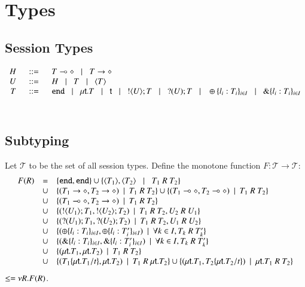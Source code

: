 \section{Types}

\subsection{Session Types}

\[
	\begin{array}{rcl}
		H &\;\;::=\;\;&	T \multimap \diamond \;\;\;|\;\;\; T \rightarrow \diamond \\
		U &\;\;::=\;\;&	H \;\;\;|\;\;\; T \;\;\;|\;\;\; \langle T \rangle \\
		T &\;\;::=\;\;&	\mathtt{end} \;\;\;|\;\;\; \mu\mathsf{t}.T \;\;\;|\;\;\; \mathsf{t} \;\;\;|\;\;\; ! \langle U \rangle ; T \;\;\;|\;\;\; ? (U) ; T
		\;\;\;|\;\;\;		\oplus \{l_i:T_i\}_{i \in I} \;\;\;|\;\;\; \& \{l_i:T_i\}_{i \in I}
	\end{array}
\]\


\subsection{Subtyping}



\begin{definition}
Let $\mathcal{T}$ to be the set of all session types.
Define the monotone function $F: \mathcal{T} \longrightarrow \mathcal{T}$:
%
\[
	\begin{array}{rcl}
		F(R)	& = &	\set{\tinact, \tinact}
			\cup	\set{\chtype{T_1}, \chtype{T_2} \bnfbar T_1\ R\ T_2}\\
			&\cup&	\set{(T_1 \sharedop \diamond, T_2 \sharedop \diamond) \setbar T_1\ R\ T_2}
			\cup	\set{(T_1 \lollipop \diamond, T_2 \lollipop \diamond) \setbar T_1\ R\ T_2}\\
			&\cup&	\set{(T_1 \lollipop \diamond, T_2 \sharedop \diamond) \setbar T_1\ R\ T_2}\\
			&\cup&	\set{(\btout{U_1} T_1, \btout{U_2} T_2) \setbar T_1\ R\ T_2, U_2\ R\ U_1}\\
			&\cup&	\set{(\btinp{U_1} T_1, \btinp{U_2} T_2) \setbar T_1\ R\ T_2, U_1\ R\ U_2}\\
			&\cup&	\set{(\btsel{l_i: T_i}_{i \in I}, \btsel{l_i: T'_i}_{i \in I}) \setbar \forall k \in I, T_k\ R\ T'_k}\\
			&\cup&	\set{(\btbra{l_i: T_i}_{i \in I}, \btbra{l_i: T'_i}_{i \in I}) \setbar \forall k \in I, T_k\ R\ T'_k}\\
			&\cup&	\set{(\trec{t} T_1, \trec{t} T_2) \setbar T_1\ R\ T_2}\\
			&\cup&	\set{(T_1\subst{\trec{t} T_1}{t}, \trec{t}{T_2}) \setbar T_1\ R\ \trec{t} T_2}
			\cup	\set{(\trec{t}{T_1}, T_2\subst{\trec{t} T_2}{t}) \setbar \trec{t} T_1\ R\ T_2}\\
	\end{array}
\]
%
$\leq = \nu R.F(R)$.
\end{definition}

